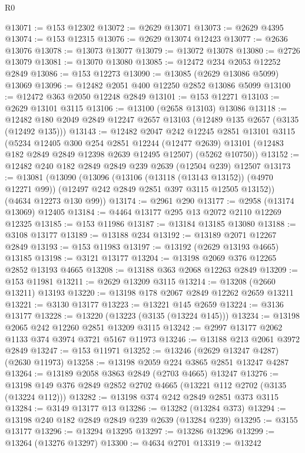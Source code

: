 \begin{lexlean}{R0}
\begin{coremodule}
@13071 := @153 @12302
@13072 := @2629 @13071
@13073 := @2629 @4395
@13074 := @153 @12315
@13076 := @2629 @13074 @12423
@13077 := @2636 @13076
@13078 := @13073 @13077
@13079 := @13072 @13078
@13080 := @2726 @13079
@13081 := @13070 @13080
@13085 := @12472 @234 @2053 @12252 @2849
@13086 := @153 @12273
@13090 := @13085 (@2629 @13086 @5099) @13069
@13096 := @12482 @2051 @400 @12250 @2852 @13086 @5099
@13100 := @12472 @363 @2050 @12248 @2849
@13101 := @153 @12271
@13103 := @2629 @13101 @3115
@13106 := @13100 (@2658 @13103) @13086
@13118 := @12482 @180 @2049 @2849 @12247 @2657 @13103 (@12489 @135 @2657 (@3135 (@12492 @135)))
@13143 := @12482
    @2047
    @242
    @12245
    @2851
    @13101
    @3115
    (@5234
      @12405
      @300
      @254
      @2851
      @12244
      (@12477 @2639)
      @13101
      (@12483 @182 @2849 @2849 @12398 @2639 @12495 @12507)
      (@5262 @10750))
@13152 := @12482 @240 @182 @2849 @2849 @239 @2639 (@12504 @239) @12507
@13173 := @13081
    (@13090
      (@13096
        (@13106 (@13118 (@13143 @13152)) (@4970 @12271 @99))
        (@12497 @242 @2849 @2851 @397 @3115 @12505 @13152))
      (@4634 @12273 @130 @99))
@13174 := @2961 @290
@13177 := @2958 (@13174 @13069) @12405
@13184 := @4464 @13177 @295 @13 @2072 @2110 @12269 @12325
@13185 := @153 @11986
@13187 := @13184 @13185 @13080
@13188 := @3108 @13177
@13189 := @13188 @234
@13192 := @13189 @2071 @12267 @2849
@13193 := @153 @11983
@13197 := @13192 (@2629 @13193 @4665) @13185
@13198 := @3121 @13177
@13204 := @13198 @2069 @376 @12265 @2852 @13193 @4665
@13208 := @13188 @363 @2068 @12263 @2849
@13209 := @153 @11981
@13211 := @2629 @13209 @3115
@13214 := @13208 (@2660 @13211) @13193
@13220 := @13198 @178 @2067 @2849 @12262 @2659 @13211
@13221 := @3130 @13177
@13223 := @13221 @145 @2659
@13224 := @3136 @13177
@13228 := @13220 (@13223 (@3135 (@13224 @145)))
@13234 := @13198 @2065 @242 @12260 @2851 @13209 @3115
@13242 := @2997 @13177 @2062 @1133 @374 @3974 @3721 @5167 @11973
@13246 := @13188 @213 @2061 @3972 @2849
@13247 := @153 @11971
@13252 := @13246 (@2629 @13247 @4287) (@2630 @11973)
@13258 := @13198 @2059 @224 @3865 @2851 @13247 @4287
@13264 := @13189 @2058 @3863 @2849 (@2703 @4665) @13247
@13276 := @13198 @149 @376 @2849 @2852 @2702 @4665 (@13221 @112 @2702 (@3135 (@13224 @112)))
@13282 := @13198 @374 @242 @2849 @2851 @373 @3115
@13284 := @3149 @13177 @13
@13286 := @13282 (@13284 @373)
@13294 := @13198 @240 @182 @2849 @2849 @239 @2639 (@13284 @239)
@13295 := @3155 @13177
@13296 := @13294 @13295
@13297 := @13286 @13296
@13299 := @13264 (@13276 @13297)
@13300 := @4634 @2701
@13319 := @13242

\end{coremodule}
\end{lexlean}
